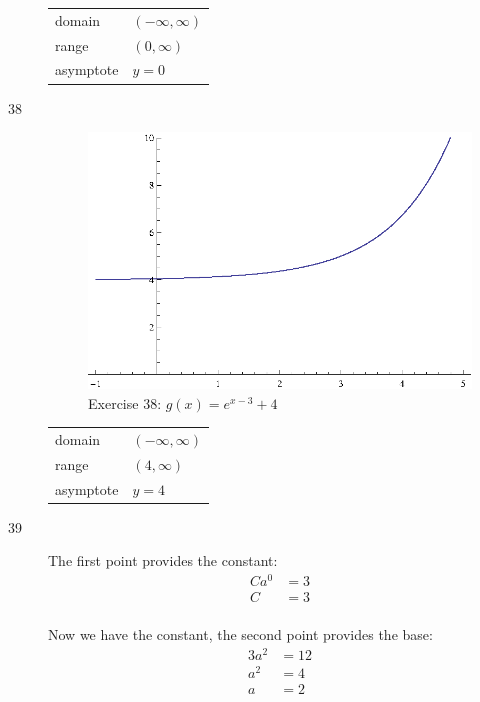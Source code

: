 \documentclass{exam}
\begin{document}
\begin{description}
        \begin{tabular}[H]{ll}
          \toprule
          domain    & $(-\infty, \infty)$ \\
          range     & $(0, \infty)$ \\
          asymptote & $y = 0$ \\
          \bottomrule
        \end{tabular}

      \item[38] 
        \begin{figure}[H]
          \centering
          \includegraphics[scale=0.9]{exercise38.eps}
          \caption*{Exercise 38: $g(x) = e^{x - 3} + 4$}
        \end{figure}

        \begin{tabular}[H]{ll}
          \toprule
          domain    & $(-\infty, \infty)$ \\
          range     & $(4, \infty)$ \\
          asymptote & $y = 4$ \\
          \bottomrule
        \end{tabular}

      \item[39]
        The first point provides the constant:
        \begin{align*}
          Ca^0 &= 3 \\
          C    &= 3 \\
        \end{align*}

        Now we have the constant, the second point provides the base:
        \begin{align*}
          3a^2 &= 12 \\
          a^2  &= 4 \\
          a    &= 2 \\
        \end{align*}


\end{description}
\end{document}
